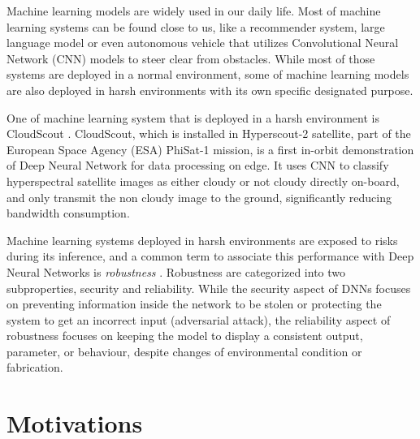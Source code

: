 \documentclass[ %
                    author={Revalda Putawara},
                supervisor={Dr. James Pope},
                    degree={MSc},
                     title={Robustness of Bayesian Neural Networks Design Choices Against Weight and Bias Perturbation Induced by Single Event Upsets (SEUs)},
                      type={},
                      year={2025}]{dissertation}
\begin{document}
Machine learning models are widely used in our daily life. Most of machine learning systems can be found close to us, like a recommender system, large language model or even autonomous vehicle that utilizes Convolutional Neural Network (CNN) models to steer clear from obstacles. While most of those systems are deployed in a normal environment, some of machine learning models are also deployed in harsh environments with its own specific designated purpose. 

One of machine learning system that is deployed in a harsh environment is CloudScout \cite{Giuffrida2020-ry}. CloudScout, which is installed in Hyperscout-2 satellite, part of the European Space Agency (ESA) PhiSat-1 mission, is a first in-orbit demonstration of Deep Neural Network for data processing on edge. It uses CNN to classify hyperspectral satellite images as either cloudy or not cloudy directly on-board, and only transmit the non cloudy image to the ground, significantly reducing bandwidth consumption.

Machine learning systems deployed in harsh environments are exposed to risks during its inference, and a common term to associate this performance with Deep Neural Networks is \textit{robustness} \cite{shafique_2021}. Robustness are categorized into two subproperties, security and reliability. While the security aspect of DNNs focuses on preventing information inside the network to be stolen or protecting the system to get an incorrect input (adversarial attack), the reliability aspect of robustness focuses on keeping the model to display a consistent output, parameter, or behaviour, despite changes of environmental condition or fabrication.

\section{Motivations} %

\end{document}
